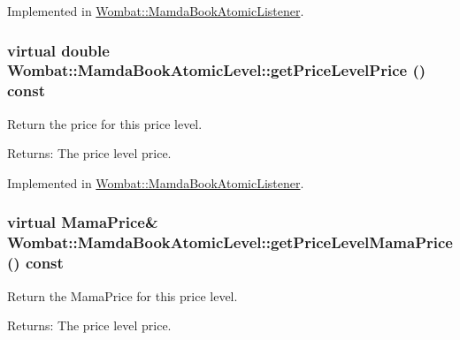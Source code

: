 Implemented in \hyperlink{classWombat_1_1MamdaBookAtomicListener_0e9aca6717995e413ba7038d38be5f63}{Wombat::Mamda\-Book\-Atomic\-Listener}.\hypertarget{classWombat_1_1MamdaBookAtomicLevel_5bcc378cd2085048f8fa1870265e5ce0}{
\subsubsection[getPriceLevelPrice]{\setlength{\rightskip}{0pt plus 5cm}virtual double Wombat::Mamda\-Book\-Atomic\-Level::get\-Price\-Level\-Price () const}}
\label{classWombat_1_1MamdaBookAtomicLevel_5bcc378cd2085048f8fa1870265e5ce0}


Return the price for this price level. 

\begin{Desc}
\item[Returns:]The price level price. \end{Desc}


Implemented in \hyperlink{classWombat_1_1MamdaBookAtomicListener_7139c6ddcae27c429e7dade0c5e91358}{Wombat::Mamda\-Book\-Atomic\-Listener}.\hypertarget{classWombat_1_1MamdaBookAtomicLevel_e250b6d0ba73f1396a7ac16a18564fc7}{
\subsubsection[getPriceLevelMamaPrice]{\setlength{\rightskip}{0pt plus 5cm}virtual Mama\-Price\& Wombat::Mamda\-Book\-Atomic\-Level::get\-Price\-Level\-Mama\-Price () const}}
\label{classWombat_1_1MamdaBookAtomicLevel_e250b6d0ba73f1396a7ac16a18564fc7}


Return the Mama\-Price for this price level. 

\begin{Desc}
\item[Returns:]The price level price. \end{Desc}


